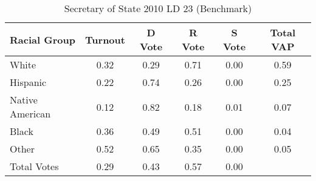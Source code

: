 \begin{table}[htb]
\begin{center}
\caption{Secretary of State 2010 LD 23 (Benchmark)}
\label{sos10_vap_ld_23_benchmark}
\begin{tabular}{lccccc}
  \hline
Racial Group & Turnout & D Vote & R Vote & S Vote & Total VAP \\ 
  \hline
White & 0.32 & 0.29 & 0.71 & 0.00 & 0.59 \\ 
  Hispanic & 0.22 & 0.74 & 0.26 & 0.00 & 0.25 \\ 
  Native American & 0.12 & 0.82 & 0.18 & 0.01 & 0.07 \\ 
  Black & 0.36 & 0.49 & 0.51 & 0.00 & 0.04 \\ 
  Other & 0.52 & 0.65 & 0.35 & 0.00 & 0.05 \\ 
  Total Votes & 0.29 & 0.43 & 0.57 & 0.00 &  \\ 
   \hline
\end{tabular}
\end{center}
\end{table}
